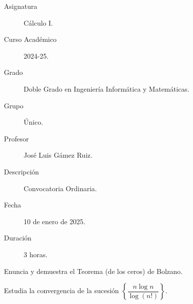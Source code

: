 \documentclass[12pt]{article}
\begin{document}
    \newcommand{\N}{{\mathbb{N}}} %
    \newcommand{\Q}{{\mathbb{Q}}} %
    \newcommand{\R}{{\mathbb{R}}} %
    
    

    \begin{description}
        \item[Asignatura] Cálculo I.
        \item[Curso Académico] 2024-25.
        \item[Grado] Doble Grado en Ingeniería Informática y Matemáticas.
        \item[Grupo] Único.
        \item[Profesor] José Luis Gámez Ruiz.
        \item[Descripción] Convocatoria Ordinaria.
        \item[Fecha] 10 de enero de 2025.
        \item[Duración] 3 horas.
    
    \end{description}
    \newpage


    
    \begin{ejercicio} Enuncia y demuestra el Teorema (de los ceros) de Bolzano. \\
    \end{ejercicio}
    
    \begin{ejercicio} Estudia la convergencia de la sucesión $\left\{\dfrac{n \log{n}}{\log(n!)}\right\}$. \\
    \end{ejercicio}
\end{document}
